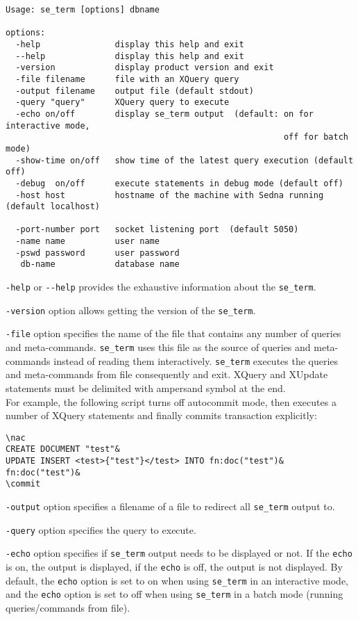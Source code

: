 \documentclass[a4paper,12pt]{article}
\begin{document}
\begin{verbatim}
Usage: se_term [options] dbname

options:
  -help			      display this help and exit
  --help		      display this help and exit
  -version		      display product version and exit
  -file filename	  file with an XQuery query
  -output filename	  output file (default stdout)
  -query "query"	  XQuery query to execute
  -echo on/off		  display se_term output  (default: on for interactive mode,
                                                        off for batch mode)
  -show-time on/off	  show time of the latest query execution (default off)
  -debug  on/off      execute statements in debug mode (default off)
  -host host		  hostname of the machine with Sedna running (default localhost)

  -port-number port	  socket listening port  (default 5050)
  -name name		  user name
  -pswd password	  user password
   db-name		      database name
\end{verbatim}

\verb!-help! or \verb!--help! provides the exhaustive information about the \verb!se_term!.

\verb!-version! option allows getting the version of the \verb!se_term!.

\verb!-file! option specifies the name of the file that contains any number of queries and meta-commands. \verb!se_term! uses this file as the source of queries and meta-commands instead of reading 
them interactively. \verb!se_term! executes the queries and meta-commands from file consequently and exit. XQuery and XUpdate statements must be delimited with ampersand symbol at the end. 
\\ For example, the following script turns off autocommit mode, then executes a number of XQuery statements and finally commits transaction explicitly:

\begin{verbatim}
\nac
CREATE DOCUMENT "test"&
UPDATE INSERT <test>{"test"}</test> INTO fn:doc("test")&
fn:doc("test")&
\commit
\end{verbatim}

\verb!-output! option specifies a filename of a file to redirect all \verb!se_term! output to.

\verb!-query! option specifies the query to execute.

\verb!-echo! option specifies if \verb!se_term! output needs to be displayed or not. If the \verb!echo! is on, the output is displayed, if the \verb!echo! is off, the output is not displayed. By default, the \verb!echo! option is set to on when using \verb!se_term! in an interactive mode, and the \verb!echo! option is set to off when using \verb!se_term! in a batch mode (running queries/commands from file).
\end{document}
